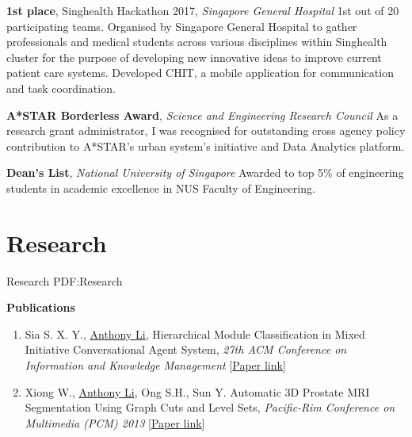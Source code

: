 \documentclass[letterpaper,10pt,oneside]{article}
\begin{document}
\begin{body}


\textbf{1st place}, \textcolor{mygray}{Singhealth Hackathon 2017}, \textit{Singapore General Hospital}
\hfill{}
\BulletItem
1st out of 20 participating teams. Organised by Singapore General Hospital to gather professionals and medical students across various disciplines within Singhealth cluster for the purpose of developing new innovative ideas to improve current patient care systems. Developed CHIT, a mobile application for communication and task coordination.
\GapNoBreak
\medskip


\textbf{A*STAR Borderless Award}, \textit{Science and Engineering Research Council}
\hfill
{}
\BulletItem
As a research grant administrator, I was recognised for outstanding cross agency policy contribution to A*STAR's urban system's initiative and Data Analytics platform.
\GapNoBreak
\medskip

\textbf{Dean's List}, \textit{National University of Singapore}
\hfill
{}
\BulletItem
Awarded to top 5\% of engineering students in academic excellence in NUS Faculty of Engineering.
\GapNoBreak


\section
{Research}
{Research}
{PDF:Research}

\textbf{Publications}
\GapNoBreak
{}

\begin{enumerate}
\item Sia S. X. Y., \underline{Anthony Li}, \textcolor{mygray}{Hierarchical Module Classification in Mixed Initiative Conversational Agent System}, \textit{27th ACM Conference on Information and Knowledge Management}
[\href{https://dl.acm.org/citation.cfm?id=3133185}{Paper link}]
\item Xiong W., \underline{Anthony Li}, Ong S.H., Sun Y. \textcolor{mygray}{Automatic 3D Prostate MRI Segmentation Using Graph Cuts and Level Sets}, \textit{Pacific-Rim Conference on Multimedia (PCM) 2013}
[\href{https://link.springer.com/chapter/10.1007/978-3-319-03731-8_20}{Paper link}]
\end{enumerate}



\end{body}
\end{document}
